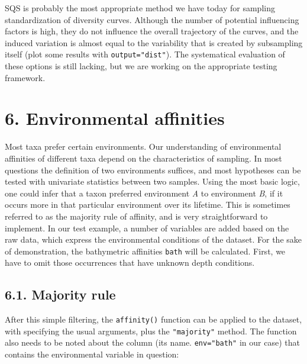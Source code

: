\documentclass[]{article}
\newenvironment{Shaded}{\begin{snugshade}}{\end{snugshade}}
\newcommand{\NormalTok}[1]{#1}
\newcommand{\OperatorTok}[1]{\textcolor[rgb]{0.81,0.36,0.00}{\textbf{#1}}}
\newcommand{\StringTok}[1]{\textcolor[rgb]{0.31,0.60,0.02}{#1}}
\begin{document}
SQS is probably the most appropriate method we have today for sampling
standardization of diversity curves. Although the number of potential
influencing factors is high, they do not influence the overall
trajectory of the curves, and the induced variation is almost equal to
the variability that is created by subsampling itself (plot some results
with \texttt{output="dist"}). The systematical evaluation of these
options is still lacking, but we are working on the appropriate testing
framework.

\hypertarget{environmental-affinities}{%
\section{6. Environmental affinities}\label{environmental-affinities}}

Most taxa prefer certain environments. Our understanding of
environmental affinities of different taxa depend on the characteristics
of sampling. In most questions the definition of two environments
suffices, and most hypotheses can be tested with univariate statistics
between two samples. Using the most basic logic, one could infer that a
taxon preferred environment \emph{A} to environment \emph{B}, if it
occurs more in that particular environment over its lifetime. This is
sometimes referred to as the majority rule of affinity, and is very
straightforward to implement. In our test example, a number of variables
are added based on the raw data, which express the environmental
conditions of the dataset. For the sake of demonstration, the
bathymetric affinities \texttt{bath} will be calculated. First, we have
to omit those occurrences that have unknown depth conditions.

\begin{Shaded}
\end{Shaded}

\hypertarget{majority-rule}{%
\subsection{6.1. Majority rule}\label{majority-rule}}

After this simple filtering, the \texttt{affinity()} function can be
applied to the dataset, with specifying the usual arguments, plus the
\texttt{"majority"} method. The function also needs to be noted about
the column (its name. \texttt{env="bath"} in our case) that contains the
environmental variable in question:
\end{document}
